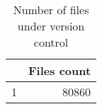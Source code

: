 \begin{table}[ht]
\begin{center}
\begin{tabular}{rr}
  \hline
 & Files count \\ 
  \hline
1 & 80860 \\ 
   \hline
\end{tabular}
\caption{Number of files under version control}
\end{center}
\end{table}
